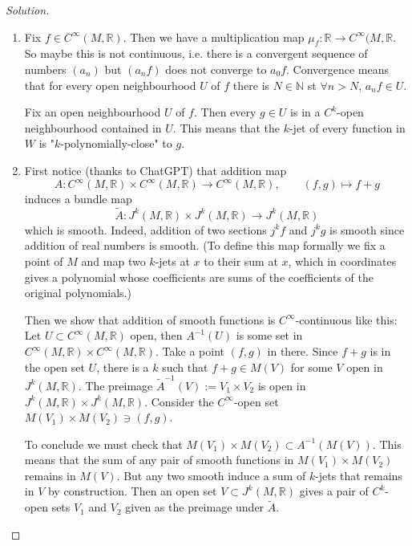 \begin{proof}[Solution]\leavevmode
\begin{enumerate}[label=(\alph*)]
\item Fix \(f \in C^\infty (M,\mathbb{R})\). Then we have a multiplication map \(\mu_f:\mathbb{R}\to C^\infty (M,\mathbb{R}\). So maybe this is not continuous, i.e. there is a convergent sequence of numbers \((a_n)\) but \((a_nf)\) does not converge to \(a_0f\). Convergence means that for every open neighbourhood \(U\) of  $f$ there is \(N \in \mathbb{N}\) st \(\forall  n>N\), \(a_nf \in U\).

	Fix an open neighbourhood \(U\) of \(f\). Then every \(g \in U\) is in a \(C^k\)-open neighbourhood contained in \(U\). This means that the \(k\)-jet of every function in \(W\) is "\(k\)-polynomially-close" to \(g\).

\item 
	First notice (thanks to ChatGPT) that addition map
	\[A: C^\infty(M,\mathbb{R}) \times C^\infty(M,\mathbb{R}) \to C^\infty(M,\mathbb{R}),\qquad  (f,g)\mapsto  f+g\]
	induces a bundle map
\[\tilde{A}:J^{k}(M,\mathbb{R})\times J^{k}(M,\mathbb{R})\longrightarrow J^{k}(M,\mathbb{R})\]
which is smooth. Indeed, addition of two sections \(j^kf\) and \(j^kg\) is smooth since addition of real numbers is smooth. (To define this map formally we fix a point of \(M\) and map two \(k\)-jets at \(x\) to their sum at \(x\), which in coordinates gives a polynomial whose coefficients are sums of the coefficients of the original polynomials.)

Then we show that addition of smooth functions is \(C^\infty\)-continuous like this: Let \(U \subset C^\infty(M,\mathbb{R})\) open, then \(A^{-1}(U)\) is some set in \(C^\infty(M,\mathbb{R}) \times C^\infty (M,\mathbb{R})\). Take a point \((f,g)\) in there. Since \(f+g\) is in the open set \(U\), there is a \(k\) such that \(f+g \in M(V)\) for some \(V\) open in \(J^k(M,\mathbb{R})\). The preimage \(\tilde{A}^{-1}(V):=V_1\times V_2\) is open in \(J^k(M,\mathbb{R})\times J^{k}(M,\mathbb{R})\). Consider the \(C^\infty\)-open set \(M(V_1) \times M(V_2) \ni (f,g)\).

To conclude we must check that \(M(V_1)\times M(V_2) \subset A^{-1}(M(V))\). This means that the sum of any pair of smooth functions in \(M(V_1) \times M(V_2)\) remains in \(M(V)\). But any two smooth induce a sum of \(k\)-jets that remains in \(V\) by construction.
\iffalse
	Then an open set \(V \subset J^{k}(M,\mathbb{R})\) gives a pair of \(C^k\)-open sets \(V_1\) and \(V_2\) given as the preimage under \(\tilde{A}\). 


\end{enumerate}
\end{proof}
